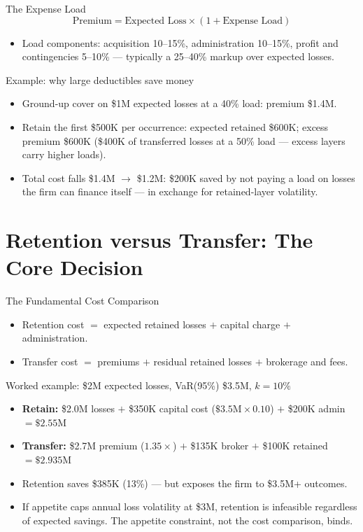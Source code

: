 \documentclass[11pt, aspectratio=169]{beamer}
\begin{document}
\begin{frame}{The Expense Load}
\[
\text{Premium} = \text{Expected Loss} \times (1 + \text{Expense Load})
\]
\begin{itemize}
  \item Load components: acquisition 10--15\%, administration 10--15\%, profit and contingencies 5--10\% --- typically a \alert{25--40\% markup} over expected losses.
\end{itemize}
\medskip
\begin{exampleblock}{Example: why large deductibles save money}
\begin{itemize}
  \item Ground-up cover on \$1M expected losses at a 40\% load: premium \$1.4M.
  \item Retain the first \$500K per occurrence: expected retained \$600K; excess premium \$600K (\$400K of transferred losses at a 50\% load --- excess layers carry higher loads).
  \item Total cost falls \$1.4M $\rightarrow$ \$1.2M: \alert{\$200K saved} by not paying a load on losses the firm can finance itself --- in exchange for retained-layer volatility.
\end{itemize}
\end{exampleblock}
\end{frame}

\section{Retention versus Transfer: The Core Decision}

\begin{frame}{The Fundamental Cost Comparison}
\begin{itemize}
  \item Retention cost $=$ expected retained losses $+$ capital charge $+$ administration.
  \item Transfer cost $=$ premiums $+$ residual retained losses $+$ brokerage and fees.
\end{itemize}
\begin{exampleblock}{Worked example: \$2M expected losses, VaR(95\%) \$3.5M, $k = 10\%$}
\begin{itemize}
  \item \textbf{Retain:} \$2.0M losses $+$ \$350K capital cost ($\$3.5\text{M} \times 0.10$) $+$ \$200K admin $= \$2.55$M
  \item \textbf{Transfer:} \$2.7M premium ($1.35\times$) $+$ \$135K broker $+$ \$100K retained $= \$2.935$M
  \item Retention saves \alert{\$385K (13\%)} --- but exposes the firm to \$3.5M+ outcomes.
  \item If appetite caps annual loss volatility at \$3M, retention is \alert{infeasible} regardless of expected savings. The appetite constraint, not the cost comparison, binds.
\end{itemize}
\end{exampleblock}
\end{frame}
\end{document}
